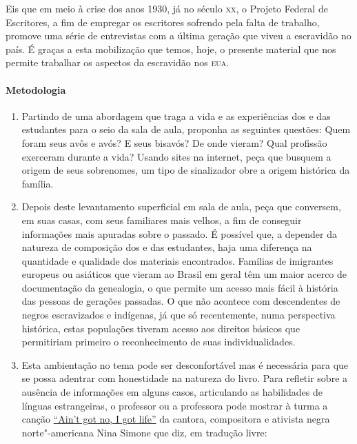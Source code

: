\documentclass[11pt]{extarticle}
\begin{document}
Eis que em meio à crise dos anos 1930, já no século \textsc{xx}, o Projeto Federal de Escritores, a fim de 
empregar os escritores sofrendo pela falta de trabalho, promove uma série de entrevistas com a
última geração que viveu a escravidão no país. É graças a esta mobilização que temos, hoje, 
o presente material que nos permite trabalhar os aspectos da escravidão nos \textsc{eua}. 

\paragraph{Metodologia}

\begin{enumerate}

  \item
  Partindo de uma abordagem que traga a vida e as experiências dos e das estudantes para
  o seio da sala de aula, proponha as seguintes questões: Quem foram seus avôs e avós?
  E seus bisavós? De onde vieram? Qual profissão exerceram durante a vida? 
  Usando sites na internet, peça que busquem a origem de seus sobrenomes, um tipo
  de sinalizador obre a origem histórica da família. 

  \item
  Depois deste levantamento superficial em sala de aula, peça que conversem, em suas
  casas, com seus familiares mais velhos, a fim de conseguir informações mais apuradas
  sobre o passado. É possível que, a depender da natureza de composição dos e das estudantes, 
  haja uma diferença na quantidade e qualidade dos
  materiais encontrados. Famílias de imigrantes europeus ou asiáticos que vieram
  ao Brasil em geral têm um maior acerco de documentação da genealogia, o que
  permite um acesso mais fácil à história das pessoas de gerações passadas. 
  O que não acontece com descendentes de negros escravizados e indígenas, já
  que só recentemente, numa perspectiva histórica, estas populações tiveram acesso 
  aos direitos básicos que permitiriam primeiro o reconhecimento de suas
  individualidades. 

  \item
  Esta ambientação no tema pode ser desconfortável mas é necessária para 
  que se possa adentrar com honestidade na natureza do livro. Para refletir
  sobre a ausência de informações em alguns casos, articulando as habilidades de 
  línguas estrangeiras, o professor ou a professora pode mostrar à turma a canção 
  \href{https://www.youtube.com/watch?v=L5jI9I03q8E}{``Ain't got no, I got life''} da cantora, compositora e ativista negra norte"-americana 
  Nina Simone que diz, em tradução livre:


\end{enumerate}
\end{document}
